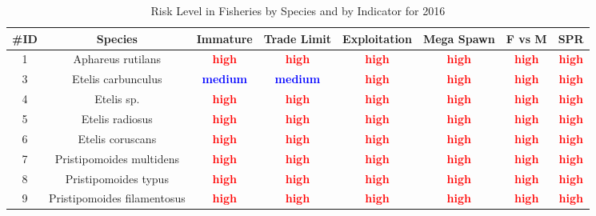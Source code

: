 \documentclass{report}\usepackage[]{graphicx}\usepackage[]{color}
\begin{document}
\begin{table}[ht]
\centering
\caption{Risk Level in Fisheries by Species and by Indicator for 2016} 
{\small
\begin{tabular}{cccccccc}
  \hline
\#ID & Species & Immature & Trade Limit & Exploitation & Mega Spawn & F vs M & SPR \\ 
  \hline
  1 & Aphareus rutilans & \textcolor{red}{\textbf{high}} & \textcolor{red}{\textbf{high}} & \textcolor{red}{\textbf{high}} & \textcolor{red}{\textbf{high}} & \textcolor{red}{\textbf{high}} & \textcolor{red}{\textbf{high}} \\ 
    3 & Etelis carbunculus & \textcolor{blue}{\textbf{medium}} & \textcolor{blue}{\textbf{medium}} & \textcolor{red}{\textbf{high}} & \textcolor{red}{\textbf{high}} & \textcolor{red}{\textbf{high}} & \textcolor{red}{\textbf{high}} \\ 
    4 & Etelis sp. & \textcolor{red}{\textbf{high}} & \textcolor{red}{\textbf{high}} & \textcolor{red}{\textbf{high}} & \textcolor{red}{\textbf{high}} & \textcolor{red}{\textbf{high}} & \textcolor{red}{\textbf{high}} \\ 
    5 & Etelis radiosus & \textcolor{red}{\textbf{high}} & \textcolor{red}{\textbf{high}} & \textcolor{red}{\textbf{high}} & \textcolor{red}{\textbf{high}} & \textcolor{red}{\textbf{high}} & \textcolor{red}{\textbf{high}} \\ 
    6 & Etelis coruscans & \textcolor{red}{\textbf{high}} & \textcolor{red}{\textbf{high}} & \textcolor{red}{\textbf{high}} & \textcolor{red}{\textbf{high}} & \textcolor{red}{\textbf{high}} & \textcolor{red}{\textbf{high}} \\ 
    7 & Pristipomoides multidens & \textcolor{red}{\textbf{high}} & \textcolor{red}{\textbf{high}} & \textcolor{red}{\textbf{high}} & \textcolor{red}{\textbf{high}} & \textcolor{red}{\textbf{high}} & \textcolor{red}{\textbf{high}} \\ 
    8 & Pristipomoides typus & \textcolor{red}{\textbf{high}} & \textcolor{red}{\textbf{high}} & \textcolor{red}{\textbf{high}} & \textcolor{red}{\textbf{high}} & \textcolor{red}{\textbf{high}} & \textcolor{red}{\textbf{high}} \\ 
    9 & Pristipomoides filamentosus & \textcolor{red}{\textbf{high}} & \textcolor{red}{\textbf{high}} & \textcolor{red}{\textbf{high}} & \textcolor{red}{\textbf{high}} & \textcolor{red}{\textbf{high}} & \textcolor{red}{\textbf{high}} \\ 

\end{tabular}}
\end{table}
\end{document}
